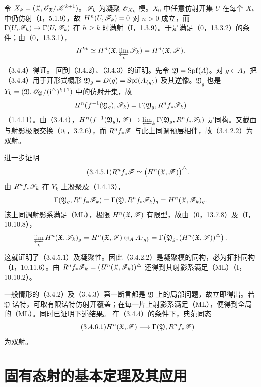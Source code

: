 令 $X_k=(\mathfrak X,\mathscr O_{\mathfrak X}/\mathscr K^{k+1})$。$\mathscr F_k$ 为凝聚 $\mathscr O_{X_k}$-模。$X_0$ 中任意仿射开集 $U$ 在每个 $X_k$ 中仍仿射（I，5.1.9），故 $H^n(U,\mathscr F_k)=0$ 对 $n>0$ 成立，而 $\Gamma(U,\mathscr F_h)\to\Gamma(U,\mathscr F_k)$ 在 $h\ge k$ 时满射（I，1.3.9）。于是满足（0，13.3.2）的条件；由（0，13.3.1），
\[
H'^n\simeq H^n(\mathfrak X,\varprojlim_k\mathscr F_k)=H^n(\mathfrak X,\mathscr F).
\]
（3.4.4）得证。\finishproof
{}
回到（3.4.2）、（3.4.3）的证明。先令 $\mathfrak Y=\operatorname{Spf}(A)$。对 $g\in A$，把（3.4.4）用于开形式概形 $\mathfrak Y_g=D(g)=\operatorname{Spf}(A_{\{g\}})$ 及其逆像。$\mathfrak Y_g$ 也是 $Y_k=(\mathfrak Y,\mathscr O_{\mathfrak Y}/(\mathfrak j^\triangle)^{k+1})$ 中的仿射开集，故
\[
H^n(f^{-1}(\mathfrak Y_g),\mathscr F_k)=\Gamma(\mathfrak Y_g,R^nf_*\mathscr F_k)
\]
（1.4.11）。由（3.4.4），$H^n(f^{-1}(\mathfrak Y_g),\mathscr F)\to\varprojlim_k\Gamma(\mathfrak Y_g,R^nf_*\mathscr F_k)$ 是同构。又截面与射影极限交换（$0_{\mathrm I}$，3.2.6），而 $R^nf_*\mathscr F$ 与此上同调预层相伴，故（3.4.2.2）为双射。

进一步证明
\begin{equation}\tag{3.4.5.1}
R^nf_*\mathscr F\simeq\bigl(H^n(\mathfrak X,\mathscr F)\bigr)^\triangle.
\end{equation}
由 $R^nf_*\mathscr F_k$ 在 $Y_k$ 上凝聚及（1.4.13），
\[
\Gamma(\mathfrak Y_g,R^nf_*\mathscr F_k)
=\Gamma(\mathfrak Y,R^nf_*\mathscr F_k)_g
=H^n(\mathfrak X,\mathscr F_k)_g.
\]
该上同调射影系满足（ML），极限 $H^n(\mathfrak X,\mathscr F)$ 有限型，故由（0，13.7.8）及（I，10.10.8），
\[
\varprojlim_kH^n(\mathfrak X,\mathscr F_k)_g
=H^n(\mathfrak X,\mathscr F)\otimes_AA_{\{g\}}
=\Gamma\!\left(\mathfrak Y_g,(H^n(\mathfrak X,\mathscr F))^\triangle\right).
\]
这就证明了（3.4.5.1）及凝聚性。因此（3.4.2.2）是凝聚模的同构，必为拓扑同构（I，10.11.6）。由 $R^nf_*\mathscr F_k=(H^n(\mathfrak X,\mathscr F_k))^\triangle$ 还得到其射影系满足（ML）（I，10.10.2）。

一般情形的（3.4.2）及（3.4.3）第一断言都是 $\mathfrak Y$ 上的局部问题，故立即得出。若 $\mathfrak Y$ 诺特，可取有限诺特仿射开覆盖；在每一片上射影系满足（ML），便得到全局的（ML）。同时已证明下述结果。
在（3.4.4）的条件下，典范同态
\begin{equation}\tag{3.4.6.1}
H^n(\mathfrak X,\mathscr F)\longrightarrow\Gamma(\mathfrak Y,R^nf_*\mathscr F)
\end{equation}
为双射。\par

\section{固有态射的基本定理及其应用}
